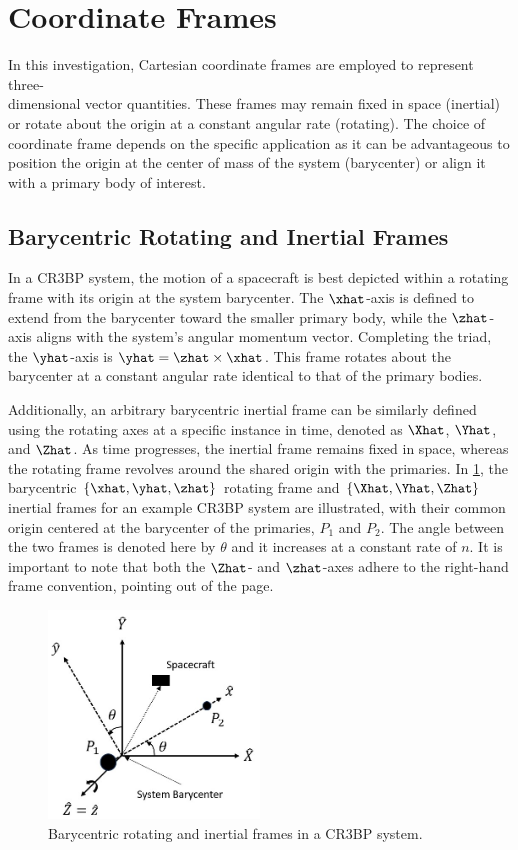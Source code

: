 \section{Coordinate Frames}
In this investigation, Cartesian coordinate frames are employed to represent three-\\dimensional
vector quantities. These frames may remain fixed in space (inertial) or rotate about the origin at
a constant angular rate (rotating). The choice of coordinate frame depends on the specific
application as it can be advantageous to position the origin at the center of mass of the system
(barycenter) or align it with a primary body of interest.

\subsection{Barycentric Rotating and Inertial Frames}
In a CR3BP system, the motion of a spacecraft is best depicted within a rotating frame with its
origin at the system barycenter. The $\xhat$-axis is defined to extend from the barycenter toward
the smaller primary body, while the $\zhat$-axis aligns with the system's angular momentum vector.
Completing the triad, the $\yhat$-axis is $\yhat=\zhat\times\xhat$. This frame rotates about the
barycenter at a constant angular rate identical to that of the primary bodies.

Additionally, an arbitrary barycentric inertial frame can be similarly defined using the rotating
axes at a specific instance in time, denoted as $\Xhat$, $\Yhat$, and $\Zhat$. As time progresses,
the inertial frame remains fixed in space, whereas the rotating frame revolves around the shared
origin with the primaries. In \cref{fig:baryFrames}, the barycentric $\{\xhat,\yhat,\zhat\}$
rotating frame and $\{\Xhat,\Yhat,\Zhat\}$ inertial frames for an example CR3BP system are
illustrated, with their common origin centered at the barycenter of the primaries, $P_{1}$ and
$P_{2}$. The angle between the two frames is denoted here by $\theta$ and it increases at a
constant rate of $n$. It is important to note that both the $\Zhat$- and $\zhat$-axes adhere to the
right-hand frame convention, pointing out of the page.

\begin{figure}[ht]
    \centering
    \includegraphics[width=0.5\textwidth]{figures/BaryFrames.jpg}
    \caption{Barycentric rotating and inertial frames in a CR3BP system.}
    \label{fig:baryFrames}
\end{figure}

